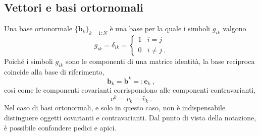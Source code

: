 \subsection{Vettori e basi ortornomali}
Una base ortonormale $\{\bm{b}_k\}_{k=1:N}$ è una base per la quale i simboli $g_{ik}$ valgono
{\color{blue}
 \begin{equation}
  g_{ik} = \delta_{ik} = 
  \begin{cases}
   1 & i = j \\
   0 & i \ne j \ .
  \end{cases}
 \end{equation}
}
Poiché i simboli $g_{ik}$ sono le componenti di una matrice identità, la base reciproca coincide alla base di riferimento,
{\color{blue}
\begin{equation}
    \bm{b}_k = \bm{b}^k =: \bm{\hat{e}}_k \ ,
\end{equation}
}
così come le componenti covarianti corrispondono alle componenti contravarianti,
{\color{blue}
\begin{equation}
  v^k = v_k = \hat{v}_k \ .
\end{equation}
Nel caso di basi ortonormali, e solo in questo caso, non è indispensabile distinguere oggetti covarianti e contravarianti. Dal punto di vista della notazione, è possibile confondere pedici e apici.
}

